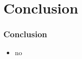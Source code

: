 \section{Conclusion}
\begin{frame}\frametitle{Conclusion}
	\begin{itemize}
		\item no
	\end{itemize}
\end{frame}